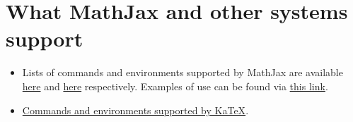 \section{What MathJax and other systems support}
\begin{itemize}
\item Lists of commands and environments supported by MathJax are available \href{https://docs.mathjax.org/en/latest/tex.html#symbols}{here} and \href{http://docs.mathjax.org/en/latest/tex.html#environments}{here} respectively. Examples of use can be found via \href{http://meta.math.stackexchange.com/questions/5020/mathjax-basic-tutorial-and-quick-reference}{this link}.
\item \href{https://github.com/Khan/KaTeX/wiki/Function-Support-in-KaTeX}{Commands and environments supported by KaTeX}.
\end{itemize}
